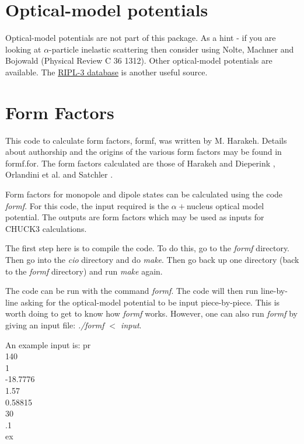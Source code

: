 \documentclass[a4paper,10pt]{article}
\begin{document}
\section{Optical-model potentials}

Optical-model potentials are not part of this package. As a hint - if you are looking at $\alpha$-particle inelastic scattering then consider using Nolte, Machner and Bojowald (Physical Review C 36 1312). Other optical-model potentials are available. The \href{https://www-nds.iaea.org/RIPL-3/}{RIPL-3 database} is another useful source.

\section{Form Factors}

This code to calculate form factors, formf, was written by M. Harakeh. Details about authorship and the origins of the various form factors may be found in formf.for. The form factors calculated are those of Harakeh and Dieperink \cite{dummy}, Orlandini et al. \cite{dummy} and Satchler \cite{dummy}.

Form factors for monopole and dipole states can be calculated using the code {\it formf}. For this code, the input required is the $\alpha+$nucleus optical model potential. The outputs are form factors which may be used as inputs for CHUCK3 calculations.

The first step here is to compile the code. To do this, go to the {\it formf} directory. Then go into the {\it cio} directory and do {\it make}. Then go back up one directory (back to the {\it formf} directory) and run {\it make} again.

The code can be run with the command {\it formf}. The code will then run line-by-line asking for the optical-model potential to be input piece-by-piece. This is worth doing to get to know how {\it formf} works. However, one can also run {\it formf} by giving an input file: {\it ./formf $<$ input}.

An example input is:
\newline
\noindent pr\\
140\\
1\\
-18.7776\\
1.57\\
0.58815\\
30\\
.1\\
ex\\
\end{document}
